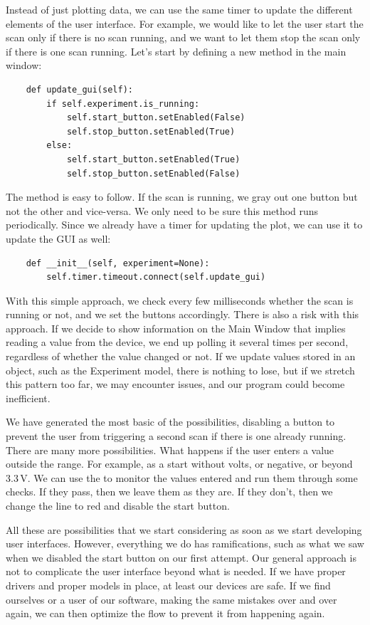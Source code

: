 Instead of just plotting data, we can use the same timer to update the different elements of the user interface. For example, we would like to let the user start the scan only if there is no scan running, and we want to let them stop the scan only if there is one scan running. Let's start by defining a new method in the main window:

\begin{verbatim}
    def update_gui(self):
        if self.experiment.is_running:
            self.start_button.setEnabled(False)
            self.stop_button.setEnabled(True)
        else:
            self.start_button.setEnabled(True)
            self.stop_button.setEnabled(False)
\end{verbatim}

The method  is easy to follow. If the scan is running, we gray out one button but not the other and vice-versa. We only need to be sure this method runs periodically. Since we already have a timer for updating the plot, we can use it to update the GUI as well:

\begin{verbatim}
    def __init__(self, experiment=None):
        self.timer.timeout.connect(self.update_gui)
\end{verbatim}

With this simple approach, we check every few milliseconds whether the scan is running or not, and we set the buttons accordingly. There is also a risk with this approach. If we decide to show information on the Main Window that implies reading a value from the device, we end up polling it several times per second, regardless of whether the value changed or not. If we update values stored in an object, such as the Experiment model, there is nothing to lose, but if we stretch this pattern too far, we may encounter issues, and our program could become inefficient.

We have generated the most basic of the possibilities, disabling a button to prevent the user from triggering a second scan if there is one already running. There are many more possibilities. What happens if the user enters a value outside the range. For example, as a start without volts, or negative, or beyond $3.3\,\textrm{V}$. We can use the  to monitor the values entered and run them through some checks. If they pass, then we leave them as they are. If they don't, then we change the line to red and disable the start button.

All these are possibilities that we start considering as soon as we start developing user interfaces. However, everything we do has ramifications, such as what we saw when we disabled the start button on our first attempt. Our general approach is not to complicate the user interface beyond what is needed. If we have proper drivers and proper models in place, at least our devices are safe. If we find ourselves or a user of our software, making the same mistakes over and over again, we can then optimize the flow to prevent it from happening again.

